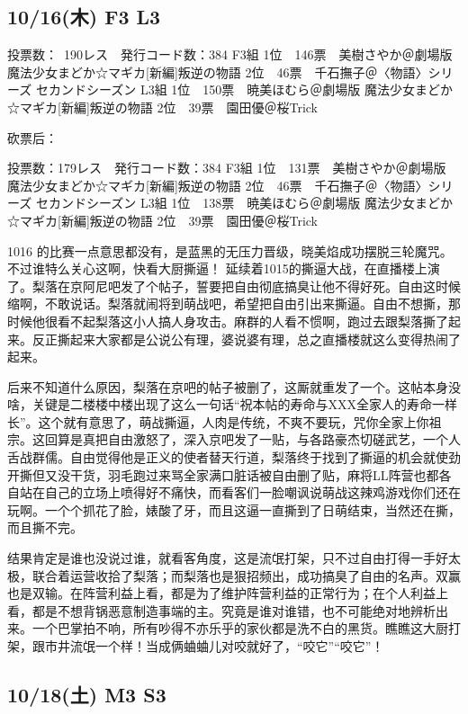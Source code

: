 \subsection{10/16(木) F3 L3}

    投票数：~190レス　発行コード数：384
    F3組
    1位　146票　美樹さやか＠劇場版 魔法少女まどか☆マギカ[新編]叛逆の物語
    2位　46票　千石撫子＠〈物語〉シリーズ セカンドシーズン
    L3組
    1位　150票　暁美ほむら＠劇場版 魔法少女まどか☆マギカ[新編]叛逆の物語
    2位　39票　園田優＠桜Trick

砍票后：

    投票数：179レス　発行コード数：384
    F3組
    1位　131票　美樹さやか＠劇場版 魔法少女まどか☆マギカ[新編]叛逆の物語
    2位　46票　千石撫子＠〈物語〉シリーズ セカンドシーズン
    L3組
    1位　138票　暁美ほむら＠劇場版 魔法少女まどか☆マギカ[新編]叛逆の物語
    2位　39票　園田優＠桜Trick

1016 的比赛一点意思都没有，是蓝黑的无压力晋级，晓美焰成功摆脱三轮魔咒。不过谁特么关心这啊，快看大厨撕逼！
延续着1015的撕逼大战，在直播楼上演了。梨落在京阿尼吧发了个帖子，誓要把自由彻底搞臭让他不得好死。自由这时候缩啊，不敢说话。梨落就闹将到萌战吧，希望把自由引出来撕逼。自由不想撕，那时候他很看不起梨落这小人搞人身攻击。麻群的人看不惯啊，跑过去跟梨落撕了起来。反正撕起来大家都是公说公有理，婆说婆有理，总之直播楼就这么变得热闹了起来。

后来不知道什么原因，梨落在京吧的帖子被删了，这厮就重发了一个。这帖本身没啥，关键是二楼楼中楼出现了这么一句话“祝本帖的寿命与XXX全家人的寿命一样长”。这个就有意思了，萌战撕逼，人肉是传统，不爽不要玩，咒你全家上你祖宗。这回算是真把自由激怒了，深入京吧发了一贴，与各路豪杰切磋武艺，一个人舌战群儒。自由觉得他是正义的使者替天行道，梨落终于找到了撕逼的机会就使劲开撕但又没干货，羽毛跑过来骂全家满口脏话被自由删了贴，麻将LL阵营也都各自站在自己的立场上喷得好不痛快，而看客们一脸嘲讽说萌战这辣鸡游戏你们还在玩啊。一个个抓花了脸，婊酸了牙，而且这逼一直撕到了日萌结束，当然还在撕，而且撕不完。

结果肯定是谁也没说过谁，就看客角度，这是流氓打架，只不过自由打得一手好太极，联合着运营收拾了梨落；而梨落也是狠招频出，成功搞臭了自由的名声。双赢也是双输。在阵营利益上看，都是为了维护阵营利益的正常行为；在个人利益上看，都是不想背锅恶意制造事端的主。究竟是谁对谁错，也不可能绝对地辨析出来。一个巴掌拍不响，所有吵得不亦乐乎的家伙都是洗不白的黑货。瞧瞧这大厨打架，跟市井流氓一个样！当成俩蛐蛐儿对咬就好了，“咬它”“咬它”！

\subsection{10/18(土) M3 S3}

